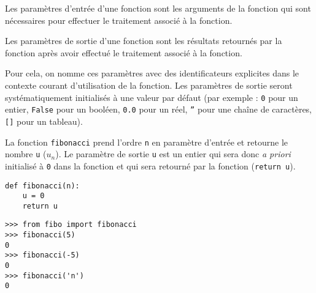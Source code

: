 \begin{defin}
Les paramètres d'entrée d'une fonction sont les arguments de la fonction
qui sont nécessaires pour effectuer le traitement associé à la fonction.
\end{defin}

\begin{defin}
Les paramètres de sortie d'une fonction sont les résultats retournés 
par la fonction après avoir effectué le traitement associé à la fonction.
\end{defin}

Pour cela, on nomme ces paramètres avec des identificateurs
explicites dans le contexte courant d'utilisation de la fonction.
Les paramètres de sortie seront systématiquement initialisés à une valeur par défaut
(par exemple : {\tt 0} pour un entier, {\tt False} pour un booléen,
{\tt 0.0} pour un réel, {\tt ''} pour une chaîne de caractères,
{\tt []} pour un tableau).

La fonction {\tt fibonacci} prend l'ordre {\tt n} en paramètre d'entrée et
retourne le nombre {\tt u} ($u_n$). Le paramètre de sortie {\tt u} est un entier 
qui sera donc {\em a priori} initialisé à {\tt 0} dans la fonction
et qui sera retourné par la fonction ({\tt return u}).

\noindent\mbox{}\hspace*{1cm}\begin{py}{6cm}
\begin{verbatim}
def fibonacci(n):
    u = 0
    return u
\end{verbatim}
\end{py}\hfill
\begin{py}{6cm}
\begin{verbatim}
>>> from fibo import fibonacci
>>> fibonacci(5)
0
>>> fibonacci(-5)
0
>>> fibonacci('n')
0
\end{verbatim}
\end{py}
\hspace*{1cm}\mbox{}\vspace*{2mm}

